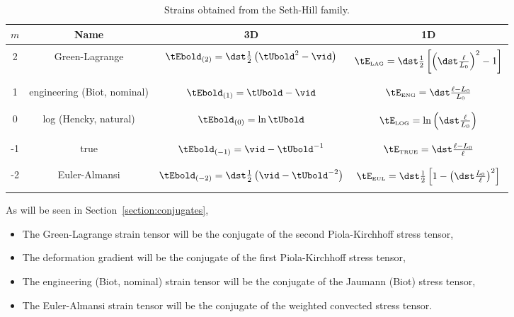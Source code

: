 \begin{table}[htb]
\caption{Strains obtained from the Seth-Hill family.}
\label{tab:table_of_strains}
\begin{center}
\begin{tabular}{|c|c|c|c|} \hline
 $m$ & {\bf Name} & {\bf 3D} & {\bf 1D} \\ \hline \hline
 & & & \\
 2 & Green-Lagrange 
   & $\tEbold_{(2)} = \dst\frac{1}{2}\left(\tUbold^2 - \vid\right)$ 
   & $\tE_{\tiny\mbox{LAG}} = 
   \dst\frac{1}{2}\left[\left(\dst\frac{\ell}{L_0}\right)^2 - 1\right]$
   \\
   & & & \\ \hline
 & & & \\
 1 & engineering (Biot, nominal)
   & $\tEbold_{(1)} = \tUbold - \vid$
   & $\tE_{\tiny\mbox{ENG}} = \dst\frac{\ell - L_0}{L_0}$
   \\
   & & & \\ \hline
 & & & \\
 0 & log (Hencky, natural)
   & $\tEbold_{(0)} = \ln\tUbold$
   & $\tE_{\tiny\mbox{LOG}} = \ln\left(\dst\frac{\ell}{L_0}\right)$
   \\
   & & & \\ \hline
 & & & \\
 -1 & true 
   & $\tEbold_{(-1)} = \vid - \tUbold^{-1}$
   & $\tE_{\tiny\mbox{TRUE}} = \dst\frac{\ell - L_0}{\ell}$
   \\
   & & & \\ \hline
 & & & \\
 -2 & Euler-Almansi 
   & $\tEbold_{(-2)} = \dst\frac{1}{2}\left(\vid - \tUbold^{-2}\right)$
   & $\tE_{\tiny\mbox{EUL}} = \dst\frac{1}{2}
   \left[ 1 - \left(\dst\frac{L_0}{\ell}\right)^2\right]$
   \\
   & & & \\ \hline
\end{tabular}
\end{center}
\end{table}

As will be seen in Section~\ref{section:conjugates}, 
\begin{itemize}
\item The Green-Lagrange strain tensor 
will be the conjugate of the second Piola-Kirchhoff stress tensor,
\item The deformation gradient will be the conjugate of the first
Piola-Kirchhoff stress tensor,
\item The engineering (Biot, nominal) strain tensor 
will be the conjugate of 
the Jaumann (Biot) stress tensor, 
\item The Euler-Almansi strain tensor will be the conjugate of the 
weighted convected stress tensor.
\end{itemize} 
\clearpage

